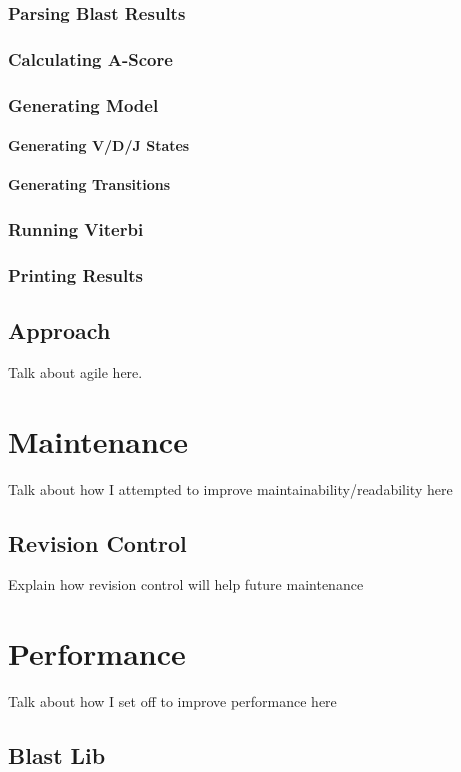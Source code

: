 \subsection{Parsing Blast Results}
\subsection{Calculating A-Score}
\subsection{Generating Model}
\subsubsection{Generating V/D/J States}
\subsubsection{Generating Transitions}
\subsection{Running Viterbi}
\subsection{Printing Results}


\section{Approach}
Talk about agile here.

\chapter{Maintenance}
Talk about how I attempted to improve maintainability/readability here

\section{Revision Control}
Explain how revision control will help future maintenance 

\chapter{Performance}
Talk about how I set off to improve performance here

\section{Blast Lib}
